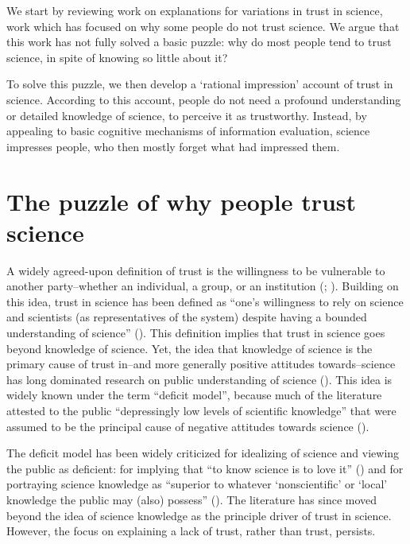 \documentclass[
  jou,
  floatsintext,
  longtable,
  nolmodern,
  notxfonts,
  notimes,
  colorlinks=true,linkcolor=blue,citecolor=blue,urlcolor=blue]{apa7}
\begin{document}
We start by reviewing work on explanations for variations in trust in
science, work which has focused on why some people do not trust science.
We argue that this work has not fully solved a basic puzzle: why do most
people tend to trust science, in spite of knowing so little about it?

To solve this puzzle, we then develop a `rational impression' account of
trust in science. According to this account, people do not need a
profound understanding or detailed knowledge of science, to perceive it
as trustworthy. Instead, by appealing to basic cognitive mechanisms of
information evaluation, science impresses people, who then mostly forget
what had impressed them.

\section{The puzzle of why people trust
science}\label{the-puzzle-of-why-people-trust-science}

A widely agreed-upon definition of trust is the willingness to be
vulnerable to another party--whether an individual, a group, or an
institution
(; ). Building on this idea, trust in science has been defined as
``one's willingness to rely on science and scientists (as
representatives of the system) despite having a bounded understanding of
science'' (). This definition implies that trust in science goes
beyond knowledge of science. Yet, the idea that knowledge of science is
the primary cause of trust in--and more generally positive attitudes
towards--science has long dominated research on public understanding of
science (). This
idea is widely known under the term ``deficit model'', because much of
the literature attested to the public ``depressingly low levels of
scientific knowledge'' that were assumed to be the principal cause of
negative attitudes towards science
().

The deficit model has been widely criticized for idealizing of science
and viewing the public as deficient: for implying that ``to know science
is to love it'' ()
and for portraying science knowledge as ``superior to whatever
`nonscientific' or `local' knowledge the public may (also) possess''
(). The
literature has since moved beyond the idea of science knowledge as the
principle driver of trust in science. However, the focus on explaining a
lack of trust, rather than trust, persists.
\end{document}
